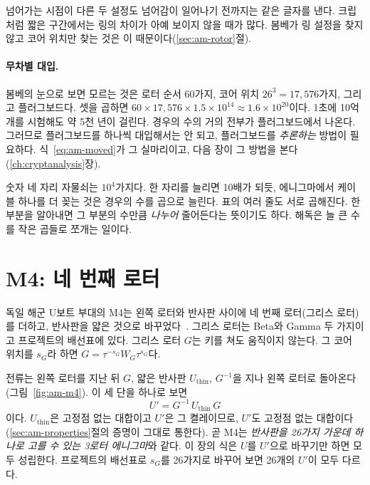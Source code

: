 넘어가는 시점이 다른 두 설정도 넘어감이 일어나기 전까지는 같은 글자를 낸다. 크립처럼 짧은 구간에서는 링의 차이가
아예 보이지 않을 때가 많다. 봄베가 링 설정을 찾지 않고 코어 위치만 찾는 것은 이 때문이다(\ref{sec:am-rotor}절).

\paragraph{무차별 대입.} 봄베의 눈으로 보면 모르는 것은 로터 순서 60가지, 코어 위치 $26^3 = 17{,}576$가지, 그리고
플러그보드다. 셋을 곱하면 $60 \times 17{,}576 \times 1.5 \times 10^{14} \approx 1.6 \times 10^{20}$이다. 1초에 10억 개를
시험해도 약 5천 년이 걸린다. 경우의 수의 거의 전부가 플러그보드에서 나온다. 그러므로 플러그보드를 하나씩 대입해서는
안 되고, 플러그보드를 \emph{추론하는} 방법이 필요하다. 식~\eqref{eq:am-moved}가 그 실마리이고, 다음 장이 그 방법을
본다(\ref{ch:cryptanalysis}장).

\General 숫자 네 자리 자물쇠는 $10^4$가지다. 한 자리를 늘리면 10배가 되듯, 에니그마에서 케이블 하나를 더 꽂는 것은
경우의 수를 곱으로 늘린다. 표의 여러 줄도 서로 곱해진다. 한 부분을 알아내면 그 부분의 수만큼 \emph{나누어} 줄어든다는
뜻이기도 하다. 해독은 늘 큰 수를 작은 곱들로 쪼개는 일이다.

\section{M4: 네 번째 로터}\label{sec:am-m4}

독일 해군 U보트 부대의 M4는 왼쪽 로터와 반사판 사이에 네 번째 로터(그리스 로터)를 더하고, 반사판을 얇은 것으로
바꾸었다~\cite{wenger1944history,cryptomuseum-m4}. 그리스 로터는 Beta와 Gamma 두 가지이고 프로젝트의 배선표에 있다.
그리스 로터 $G$는 키를 쳐도 움직이지 않는다. 그 코어 위치를 $s_G$라 하면 $G = \tau^{-s_G}W_G\tau^{s_G}$다.

전류는 왼쪽 로터를 지난 뒤 $G$, 얇은 반사판 $U_{\mathrm{thin}}$, $G^{-1}$을 지나 왼쪽 로터로 돌아온다
(그림~\ref{fig:am-m4}). 이 세 단을 하나로 보면
\begin{equation}
  U' = G^{-1}\, U_{\mathrm{thin}}\, G \label{eq:am-m4}
\end{equation}
이다. $U_{\mathrm{thin}}$은 고정점 없는 대합이고 $U'$은 그 켤레이므로, $U'$도 고정점 없는 대합이다
(\ref{sec:am-properties}절의 증명이 그대로 통한다). 곧 M4는 \emph{반사판을 26가지 가운데 하나로 고를 수 있는 3로터
에니그마}와 같다. 이 장의 식은 $U$를 $U'$으로 바꾸기만 하면 모두 성립한다. 프로젝트의 배선표로 $s_G$를 26가지로
바꾸어 보면 26개의 $U'$이 모두 다르다.

